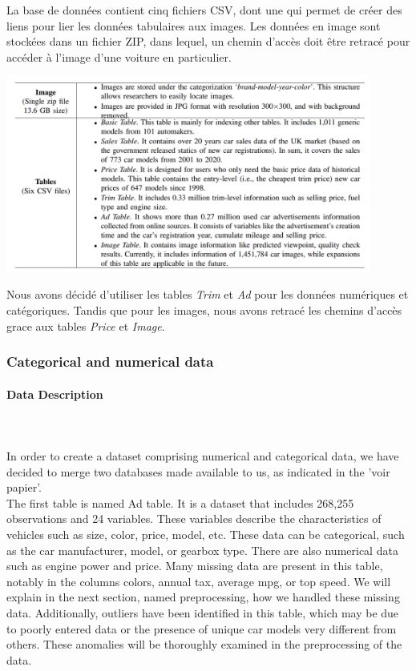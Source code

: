 \documentclass[12pt]{article}
\begin{document}
\noindent La base de données contient cinq fichiers CSV, dont une qui permet de créer des liens pour lier les données tabulaires aux images. Les données en image sont stockées dans un fichier ZIP, dans lequel, un chemin d'accès doit être retracé pour accéder à l'image d'une voiture en particulier.

\includegraphics[width=0.9\textwidth]{overviewDVMdata.png}\\
\vspace{0.5cm}

\noindent Nous avons décidé d'utiliser les tables \textit{Trim} et \textit{Ad} pour les données numériques et catégoriques.
\noindent Tandis que pour les images, nous avons retracé les chemins d'accès grace aux tables \textit{Price} et \textit{Image}. 

\subsubsection{Categorical and numerical data}

\paragraph{Data Description}
~~\\
\\

\noindent In order to create a dataset comprising numerical and categorical data, we have decided to merge two databases made available to us, as indicated in the 'voir papier'.\\

\noindent The first table is named Ad table. It is a dataset that includes 268,255 observations and 24 variables. These variables describe the characteristics of vehicles such as size, color, price, model, etc. These data can be categorical, such as the car manufacturer, model, or gearbox type. There are also numerical data such as engine power and price. Many missing data are present in this table, notably in the columns colors, annual tax, average mpg, or top speed. We will explain in the next section, named preprocessing, how we handled these missing data. Additionally, outliers have been identified in this table, which may be due to poorly entered data or the presence of unique car models very different from others. These anomalies will be thoroughly examined in the preprocessing of the data.\\
\end{document}
